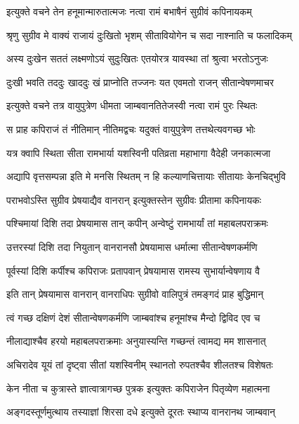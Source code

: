 \twolineshloka
{इत्युक्ते वचने तेन हनूमान्मारुतात्मजः}
{नत्वा रामं बभाषैनं सुग्रीवं कपिनायकम्} %

\twolineshloka
{श्रृणु सुग्रीव मे वाक्यं राजायं दुःखितो भृशम्}
{सीतावियोगेन च सदा नाश्नाति च फलादिकम्} %

\twolineshloka
{अस्य दुःखेन सततं लक्ष्मणोऽयं सुदुःखितः}
{एतयोरत्र यावस्था तां श्रुत्वा भरतोऽनुजः} %

\twolineshloka
{दुःखी भवति तददुः खाददुः खं प्राप्नोति तज्जनः}
{यत एवमतो राजन् सीतान्वेषणमाचर} %

\twolineshloka
{इत्युक्ते वचने तत्र वायुपुत्रेण धीमता}
{जाम्बवानतितेजस्वी नत्वा रामं पुरः स्थितः} %

\twolineshloka
{स प्राह कपिराजं तं नीतिमान् नीतिमद्वचः}
{यदुक्तं वायुपुत्रेण तत्तथेत्यवगच्छ भोः} %

\twolineshloka
{यत्र क्वापि स्थिता सीता रामभार्या यशस्विनी}
{पतिव्रता महाभागा वैदेही जनकात्मजा} %

\twolineshloka
{अद्यापि वृत्तसम्पन्ना इति मे मनसि स्थितम्}
{न हि कल्याणचित्तायाः सीतायाः केनचिद्भुवि} %

\twolineshloka
{पराभवोऽस्ति सुग्रीव प्रेषयाद्यैव वानरान्}
{इत्युक्तस्तेन सुग्रीवः प्रीतामा कपिनायकः} %

\twolineshloka
{पश्चिमायां दिशि तदा प्रेषयामास तान् कपीन्}
{अन्वेष्टुं रामभार्यां तां महाबलपराक्रमः} %

\twolineshloka
{उत्तरस्यां दिशि तदा नियुतान् वानरानसौ}
{प्रेषयामास धर्मात्मा सीतान्वेषणकर्मणि} %

\twolineshloka
{पूर्वस्यां दिशि कर्पीश्च कपिराजः प्रतापवान्}
{प्रेषयामास रामस्य सुभार्यान्वेषणाय वै} %

\twolineshloka
{इति तान् प्रेषयामास वानरान् वानराधिपः}
{सुग्रीवो वालिपुत्रं तमङ्गदं प्राह बुद्धिमान्} %

\twolineshloka
{त्वं गच्छ दक्षिणं देशं सीतान्वेषणकर्मणि}
{जाम्बवांश्च हनूमांश्च मैन्दो द्विविद एव च} %

\twolineshloka
{नीलाद्याश्चैव हरयो महाबलपराक्रमाः}
{अनुयास्यन्ति गच्छन्तं त्वामद्य मम शासनात्} %

\twolineshloka
{अचिरादेव यूयं तां दृष्ट्वा सीतां यशस्विनीम्}
{स्थानतो रुपतश्चैव शीलतश्च विशेषतः} %

\twolineshloka
{केन नीता च कुत्रास्ते ज्ञात्वात्रागच्छ पुत्रक}
{इत्युक्तः कपिराजेन पितृव्येण महात्मना} %

\twolineshloka
{अङ्गदस्तूर्णमुत्थाय तस्याज्ञां शिरसा दधे}
{इत्युक्ते दूरतः स्थाप्य वानरानथ जाम्बवान्} %

